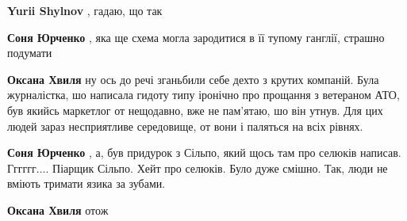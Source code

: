 \begin{itemize}
\begin{itemize}
 
\textbf{Yurii Shylnov} , гадаю, що так

 
\textbf{Соня Юрченко} , яка ще схема могла зародитися в її тупому ганглії, страшно подумати

 
\textbf{Оксана Хвиля} ну ось до речі зганьбили себе дехто з крутих компаній.
Була журналістка, шо написала гидоту типу іронічно про прощання з ветераном
АТО, був якийсь маркетлог от нещодавно, вже не пам'ятаю, шо він утнув. Для цих
людей зараз несприятливе середовище, от вони і паляться на всіх рівнях.

 
\textbf{Соня Юрченко} , а, був придурок з Сільпо, який щось там про селюків
написав. Гггггг.... Піарщик Сільпо. Хейт про селюків. Було дуже смішно. Так,
люди не вміють тримати язика за зубами.

 
\textbf{Оксана Хвиля} отож

 

\end{itemize}
\end{itemize}
